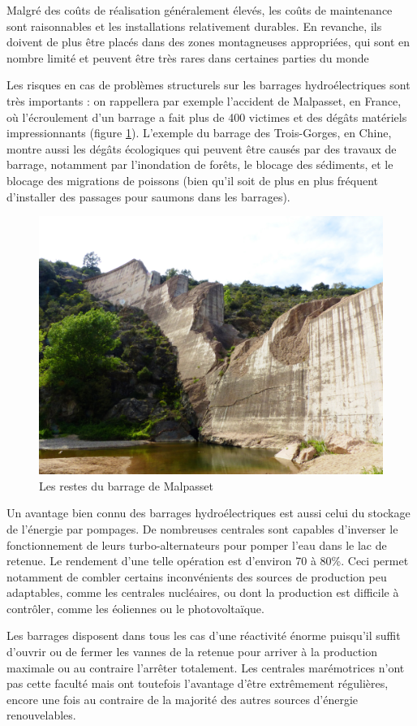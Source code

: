 \documentclass[12pt,a4paper,oneside,openany]{memoir}
\begin{document}
Malgré des coûts de réalisation généralement élevés, les coûts de maintenance sont raisonnables et les installations relativement durables. En revanche, ils doivent de plus être placés dans des zones montagneuses appropriées, qui sont en nombre limité et peuvent être très rares dans certaines parties du monde\textellipsis

Les risques en cas de problèmes structurels sur les barrages hydroélectriques sont très importants : on rappellera par exemple l'accident de Malpasset, en France, où l'écroulement d'un barrage a fait plus de 400 victimes et des dégâts matériels impressionnants (figure \ref{fig:malpasset}). L'exemple du barrage des Trois-Gorges, en Chine, montre aussi les dégâts écologiques qui peuvent être causés par des travaux de barrage, notamment par l'inondation de forêts, le blocage des sédiments, et le blocage des migrations de poissons (bien qu'il soit de plus en plus fréquent d'installer des passages pour saumons dans les barrages).

\begin{figure}
\centering
\includegraphics[width=0.9\linewidth]{img/malpasset.jpg}
\caption{Les restes du barrage de Malpasset}
\label{fig:malpasset}
\end{figure}

Un avantage bien connu des barrages hydroélectriques est aussi celui du stockage de l'énergie par pompages. De nombreuses centrales sont capables d'inverser le fonctionnement de leurs turbo-alternateurs pour pomper l'eau dans le lac de retenue. Le rendement d'une telle opération est d'environ 70 à 80\%. Ceci permet notamment de combler certains inconvénients des sources de production peu adaptables, comme les centrales nucléaires, ou dont la production est difficile à contrôler, comme les éoliennes ou le photovoltaïque.

Les barrages disposent dans tous les cas d'une réactivité énorme puisqu'il suffit d'ouvrir ou de fermer les vannes de la retenue pour arriver à la production maximale ou au contraire l'arrêter totalement. Les centrales marémotrices n'ont pas cette faculté mais ont toutefois l'avantage d'être extrêmement régulières, encore une fois au contraire de la majorité des autres sources d'énergie renouvelables.
\end{document}
